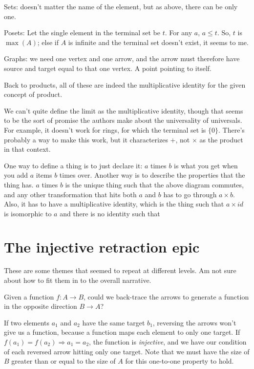 \documentclass[11pt]{article}
\begin{document}
Sets: doesn't matter the name of the element, but as above, there can be only one.

Posets: Let the single element in the terminal set be $t$. For any $a$, $a\leq t$. So, $t$
is $\max(A)$; else if $A$ is infinite and the terminal set doesn't exist, it seems to me.

Graphs: we need one vertex and one arrow, and the arrow must therefore have source and
target equal to that one vertex. A point pointing to itself.

Back to products, all of these are indeed the multiplicative identity for the given
concept of product.

We can't quite define the limit as the multiplicative identity, though that seems to be
the sort of  promise the authors make about the universality of universals. For example,
it doesn't work for rings, for which the terminal set is $\{0\}$. There's probably a way
to make this work, but it characterizes $+$, not $\times$ as the product in that context.

One way to define a thing is to just declare it: $a$ times $b$ is what you get when you
add $a$ items $b$ times over. Another way is to describe the properties that the thing
has. $a$ times $b$ is the unique thing such that the above diagram commutes, and any other
transformation that hits both $a$ and $b$ has to go through $a\times b$. Also, it has to
have a multiplicative identity, which is the thing such that $a\times id$ is isomorphic
to $a$ and there is no identity such that 

\section{The injective retraction epic}\label{injectivesec}
These are some themes that seemed to repeat at
different levels. Am not sure about how to fit them in to the overall narrative.

Given a function $f:A\to B$, could we back-trace the arrows to generate a function in the opposite direction $B\to A$?

If two elements $a_1$ and $a_2$ have the same target $b_1$, reversing the arrows
won't give us a function, because a function maps each element to only one target.
If $f(a_1)=f(a_2) \Rightarrow a_1=a_2$, the function is {\em injective}, and we have our
condition of each reversed arrow hitting only one target. Note that we must have the size
of $B$ greater than or equal to the size of $A$ for this one-to-one property to hold.
\end{document}
